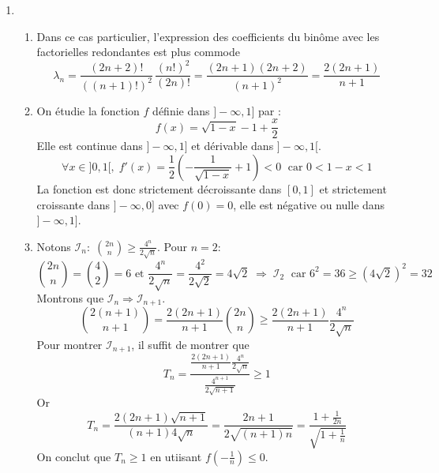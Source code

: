 \begin{enumerate}
\begin{enumerate}
\end{enumerate}

  \item
\begin{enumerate}
\item Dans ce cas particulier, l'expression des coefficients du binôme avec les factorielles redondantes est plus commode
\begin{displaymath}
\lambda_n = \frac{(2n+2)!}{((n+1)!)^2}\, \frac{(n!)^2}{(2n)!}
= \frac{(2n+1)(2n+2)}{(n+1)^2} = \frac{2(2n+1)}{n+1}
\end{displaymath}

\item On étudie la fonction $f$ définie dans $]-\infty , 1]$ par :
\begin{displaymath}
f(x) = \sqrt{1-x} -1 + \frac{x}{2}
\end{displaymath}
Elle est continue dans $]-\infty,1]$ et dérivable dans $]-\infty,1[$.
\begin{displaymath}
\forall x\in ]0,1[, \;
f'(x) = \frac{1}{2}\left( -\frac{1}{\sqrt{1-x}} + 1 \right) < 0 \; \text{ car } 0 < 1-x < 1 
\end{displaymath}
La fonction est donc strictement décroissante dans $[0,1]$ et strictement croissante dans $]-\infty,0]$ avec $f(0) = 0$, elle est négative ou nulle dans $]-\infty,1]$.

\item Notons $\mathcal{I}_n:\;  \binom{2n}{n} \geq \frac{4^n}{2\sqrt{n}}$. Pour $n=2$:
\begin{displaymath}
\binom{2n}{n} = \binom{4}{2} = 6 \text{ et } \frac{4^n}{2\sqrt{n}} = \frac{4^2}{2\sqrt{2}} = 4\sqrt{2}
\;\Rightarrow\;  \mathcal{I}_2 \;\text{ car } 6^2 = 36 \geq (4\sqrt{2})^2 = 32
\end{displaymath}
Montrons que $\mathcal{I}_n \Rightarrow \mathcal{I}_{n+1}$.
\begin{displaymath}
\binom{2(n+1)}{n+1} = \frac{2(2n+1)}{n+1}\binom{2n}{n} \geq \frac{2(2n+1)}{n+1} \frac{4^n}{2\sqrt{n}}   
\end{displaymath}
Pour montrer $\mathcal{I}_{n+1}$, il suffit de montrer que 
\begin{displaymath}
  T_n = \frac{\frac{2(2n+1)}{n+1} \frac{4^n}{2\sqrt{n}}}{\frac{4^{n+1}}{2\sqrt{n+1}}} \geq 1
\end{displaymath}
Or
\begin{displaymath}
T_n = \frac{2(2n+1)\sqrt{n+1}}{(n+1)4\sqrt{n}} = \frac{2n+1}{2\sqrt{(n+1)n}} = \frac{1+\frac{1}{2n}}{\sqrt{1+\frac{1}{n}}} 
\end{displaymath}
On conclut que $T_n \geq 1$ en utiisant $f(-\frac{1}{n}) \leq 0$.
\end{enumerate}
\end{enumerate}


